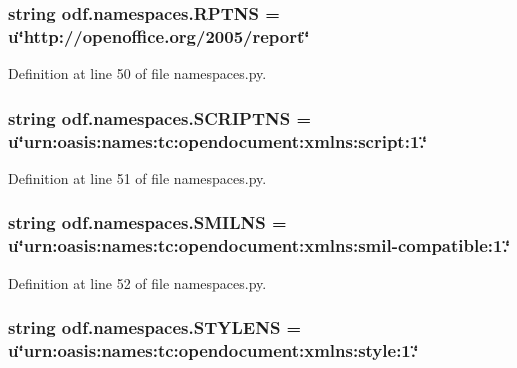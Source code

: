 \hypertarget{namespaceodf_1_1namespaces_aa19decc412dfa49234ae87fb4222613b}{
\subsubsection[{R\+P\+T\+N\+S}]{\setlength{\rightskip}{0pt plus 5cm}string odf.\+namespaces.\+R\+P\+T\+N\+S = u\char`\"{}http\+://openoffice.\+org/2005/report\char`\"{}}}\label{namespaceodf_1_1namespaces_aa19decc412dfa49234ae87fb4222613b}


Definition at line 50 of file namespaces.\+py.

\hypertarget{namespaceodf_1_1namespaces_adbf809d180b9b60e603e9d9f62dc0b98}{
\subsubsection[{S\+C\+R\+I\+P\+T\+N\+S}]{\setlength{\rightskip}{0pt plus 5cm}string odf.\+namespaces.\+S\+C\+R\+I\+P\+T\+N\+S = u\char`\"{}urn\+:oasis\+:names\+:tc\+:opendocument\+:xmlns\+:script\+:1.\char`\"{}}}\label{namespaceodf_1_1namespaces_adbf809d180b9b60e603e9d9f62dc0b98}


Definition at line 51 of file namespaces.\+py.

\hypertarget{namespaceodf_1_1namespaces_a60009581c5ffcc49479aa29774c3e433}{
\subsubsection[{S\+M\+I\+L\+N\+S}]{\setlength{\rightskip}{0pt plus 5cm}string odf.\+namespaces.\+S\+M\+I\+L\+N\+S = u\char`\"{}urn\+:oasis\+:names\+:tc\+:opendocument\+:xmlns\+:smil-\/compatible\+:1.\char`\"{}}}\label{namespaceodf_1_1namespaces_a60009581c5ffcc49479aa29774c3e433}


Definition at line 52 of file namespaces.\+py.

\hypertarget{namespaceodf_1_1namespaces_a4a82ea4fcc9e0ece518960835ea52bf8}{
\subsubsection[{S\+T\+Y\+L\+E\+N\+S}]{\setlength{\rightskip}{0pt plus 5cm}string odf.\+namespaces.\+S\+T\+Y\+L\+E\+N\+S = u\char`\"{}urn\+:oasis\+:names\+:tc\+:opendocument\+:xmlns\+:style\+:1.\char`\"{}}}\label{namespaceodf_1_1namespaces_a4a82ea4fcc9e0ece518960835ea52bf8}


